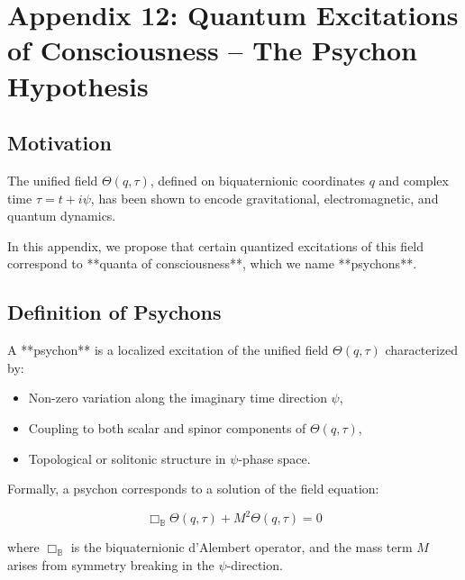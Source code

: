 

\section*{Appendix 12: Quantum Excitations of Consciousness – The Psychon Hypothesis}


\ConsciousnessDisclaimer

\subsection*{Motivation}

The unified field \(\Theta(q, \tau)\), defined on biquaternionic coordinates \(q\) and complex time \(\tau = t + i\psi\),
has been shown to encode gravitational, electromagnetic, and quantum dynamics.

In this appendix, we propose that certain quantized excitations of this field correspond to **quanta of consciousness**,
which we name **psychons**.

\subsection*{Definition of Psychons}

A **psychon** is a localized excitation of the unified field \(\Theta(q, \tau)\) characterized by:
\begin{itemize}
  \item Non-zero variation along the imaginary time direction \(\psi\),
  \item Coupling to both scalar and spinor components of \(\Theta(q, \tau)\),
  \item Topological or solitonic structure in \(\psi\)-phase space.
\end{itemize}

Formally, a psychon corresponds to a solution of the field equation:

\[
\Box_{\mathbb{B}} \Theta(q, \tau) + M^2 \Theta(q, \tau) = 0
\]

where \(\Box_{\mathbb{B}}\) is the biquaternionic d'Alembert operator, and the mass term \(M\) arises from symmetry breaking in the \(\psi\)-direction.

